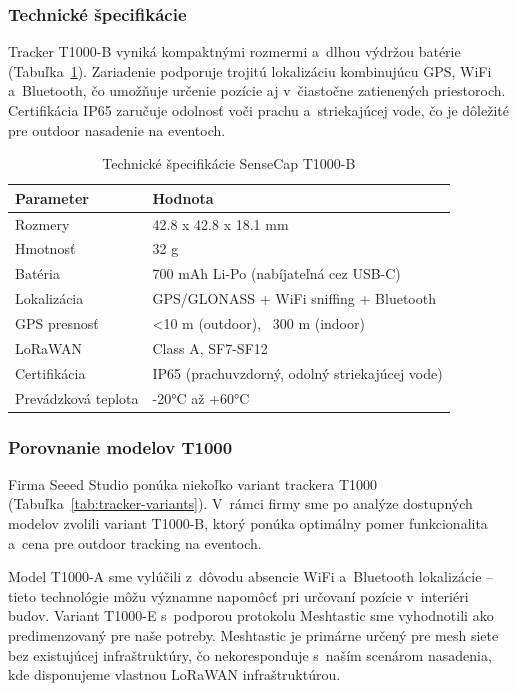 \subsubsection{Technické špecifikácie}

Tracker T1000-B vyniká kompaktnými rozmermi a~dlhou výdržou batérie (Tabuľka~\ref{tab:tracker-specs}). Zariadenie podporuje trojitú lokalizáciu kombinujúcu GPS, WiFi a~Bluetooth, čo umožňuje určenie pozície aj v~čiastočne zatienených priestoroch. Certifikácia IP65 zaručuje odolnosť voči prachu a~striekajúcej vode, čo je dôležité pre outdoor nasadenie na eventoch.

\begin{table}[htbp]
    \centering
    \begin{tabular}{|l|l|}
        \hline
        \textbf{Parameter} & \textbf{Hodnota} \\
        \hline
        Rozmery & 42.8 x 42.8 x 18.1 mm \\
        Hmotnosť & 32 g \\
        Batéria & 700 mAh Li-Po (nabíjateľná cez USB-C) \\
        Lokalizácia & GPS/GLONASS + WiFi sniffing + Bluetooth \\
        GPS presnosť & <10 m (outdoor), ~300 m (indoor) \\
        LoRaWAN & Class A, SF7-SF12 \\
        Certifikácia & IP65 (prachuvzdorný, odolný striekajúcej vode) \\
        Prevádzková teplota & -20°C až +60°C \\
        \hline
    \end{tabular}
    \caption{Technické špecifikácie SenseCap T1000-B}
    \label{tab:tracker-specs}
\end{table}

\subsubsection{Porovnanie modelov T1000}

Firma Seeed Studio ponúka niekoľko variant trackera T1000 (Tabuľka~\ref{tab:tracker-variants}). V~rámci firmy sme po analýze dostupných modelov zvolili variant T1000-B, ktorý ponúka optimálny pomer funkcionalita a~cena pre outdoor tracking na eventoch.

Model T1000-A sme vylúčili z~dôvodu absencie WiFi a~Bluetooth lokalizácie -- tieto technológie môžu významne napomôcť pri určovaní pozície v~interiéri budov. Variant T1000-E s~podporou protokolu Meshtastic sme vyhodnotili ako predimenzovaný pre naše potreby. Meshtastic je primárne určený pre mesh siete bez existujúcej infraštruktúry, čo nekoresponduje s~naším scenárom nasadenia, kde disponujeme vlastnou LoRaWAN infraštruktúrou.

